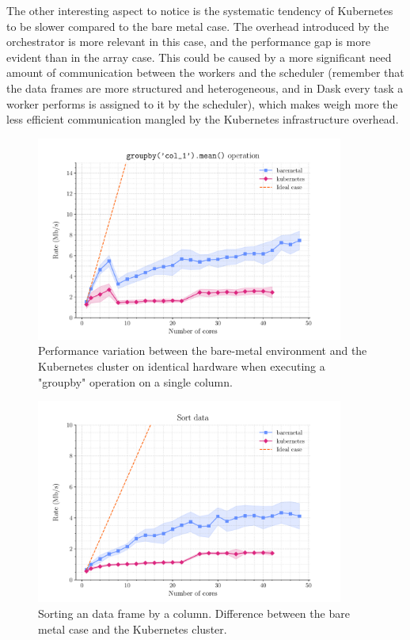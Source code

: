 The other interesting aspect to notice is the systematic tendency of Kubernetes
to be slower compared to the bare metal case. The overhead introduced by the
orchestrator is more relevant in this case, and the performance gap is more
evident than in the array case.
This could be caused by a more significant need amount of communication between
the workers and the scheduler (remember that the data frames are more structured
and heterogeneous, and in Dask every task a worker performs is assigned to it by
the scheduler), which makes weigh more the less efficient communication mangled
by the Kubernetes infrastructure overhead.

\begin{figure}
  \centering
  \includegraphics[width=0.9\textwidth]{img/chpt4/df-group-by-operation}
  \caption{Performance variation between the bare-metal environment and the
    Kubernetes cluster on identical hardware when executing a "groupby"
    operation on a single column.}
  \label{fig:dataframe-reduction-std}
\end{figure}

\begin{figure}
  \centering
  \includegraphics[width=0.9\textwidth]{img/chpt4/df-order-data}
  \caption{Sorting an data frame by a column. Difference between the bare metal
    case and the Kubernetes cluster.}
  \label{fig:dataframe-sort}
\end{figure}

